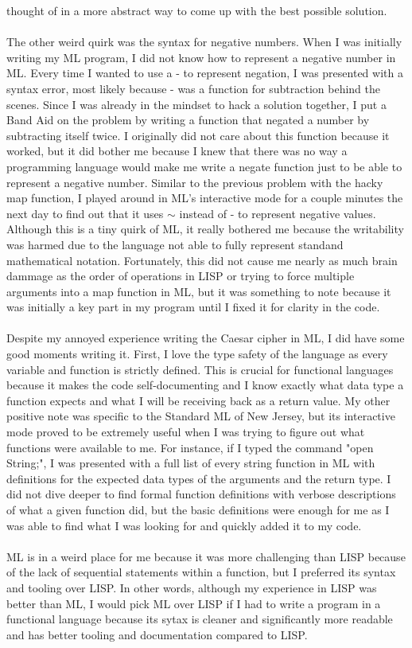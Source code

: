 \documentclass[letterpaper, 10pt, DIV=13]{scrartcl}
\numberwithin{equation}{section}
\numberwithin{figure}{section}
\numberwithin{table}{section}
\begin{document}
thought of in a more abstract way to come up with the best possible solution.
\\ \\
The other weird quirk was the syntax for negative numbers. When I was initially writing my ML program, I did not know how to represent a negative number in ML.
Every time I wanted to use a - to represent negation, I was presented with a syntax error, most likely because - was a function for subtraction behind the scenes.
Since I was already in the mindset to hack a solution together, I put a Band Aid on the problem by writing a function that negated a number by subtracting itself
twice. I originally did not care about this function because it worked, but it did bother me because I knew that there was no way a programming language would
make me write a negate function just to be able to represent a negative number. Similar to the previous problem with the hacky map function, I played around in 
ML's interactive mode for a couple minutes the next day to find out that it uses $\sim$ instead of - to represent negative values. Although this is a tiny quirk of ML, 
it really bothered me because the writability was harmed due to the language not able to fully represent standand mathematical notation. Fortunately, this did not 
cause me nearly as much brain dammage as the order of operations in LISP or trying to force multiple arguments into a map function in ML, but it was something to note
because it was initially a key part in my program until I fixed it for clarity in the code.
\\ \\
Despite my annoyed experience writing the Caesar cipher in ML, I did have some good moments writing it. First, I love the type safety of the language as every
variable and function is strictly defined. This is crucial for functional languages because it makes the code self-documenting and I know exactly what data type
a function expects and what I will be receiving back as a return value. My other positive note was specific to the Standard ML of New Jersey, but its interactive
mode proved to be extremely useful when I was trying to figure out what functions were available to me. For instance, if I typed the command "open String;", I was 
presented with a full list of every string function in ML with definitions for the expected data types of the arguments and the return type. I did not dive deeper to
find formal function definitions with verbose descriptions of what a given function did, but the basic definitions were enough for me as I was able to find
what I was looking for and quickly added it to my code.
\\ \\
ML is in a weird place for me because it was more challenging than LISP because of the lack of sequential statements within a function, but I preferred its syntax and
tooling over LISP. In other words, although my experience in LISP was better than ML, I would pick ML over LISP if I had to write a program in a functional language
because its sytax is cleaner and significantly more readable and has better tooling and documentation compared to LISP.
\end{document}
